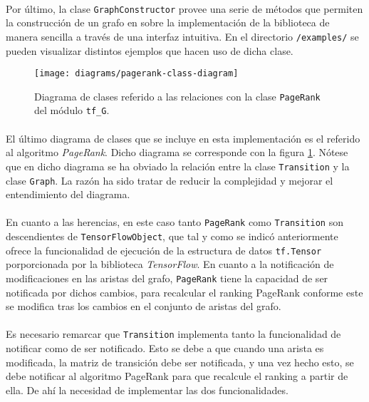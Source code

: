 \documentclass{subfiles}
\begin{document}
          \paragraph{}
          Por último, la clase \texttt{GraphConstructor} provee una serie de métodos que permiten la construcción de un grafo en sobre la implementación de la biblioteca de manera sencilla a través de una interfaz intuitiva. En el directorio \texttt{/examples/} se pueden visualizar distintos ejemplos que hacen uso de dicha clase.

          \begin{figure}[h!]
            \centering
            \texttt{[image: diagrams/pagerank-class-diagram]}
            \caption{Diagrama de clases referido a las relaciones con la clase \texttt{PageRank} del módulo \texttt{tf\_G}.}
            \label{img:pagerank_diagram}
          \end{figure}

          \paragraph{}
          El último diagrama de clases que se incluye en esta implementación es el referido al algoritmo \emph{PageRank}. Dicho diagrama se corresponde con la figura \ref{img:pagerank_diagram}. Nótese que en dicho diagrama se ha obviado la relación entre la clase \texttt{Transition} y la clase \texttt{Graph}. La razón ha sido tratar de reducir la complejidad y mejorar el entendimiento del diagrama.

          \paragraph{}
          En cuanto a las herencias, en este caso tanto \texttt{PageRank} como \texttt{Transition} son descendientes de \texttt{TensorFlowObject}, que tal y como se indicó anteriormente ofrece la funcionalidad de ejecución de la estructura de datos \texttt{tf.Tensor} porporcionada por la biblioteca \emph{TensorFlow}. En cuanto a la notificación de modificaciones en las aristas del grafo, \texttt{PageRank} tiene la capacidad de ser notificada por dichos cambios, para recalcular el ranking PageRank conforme este se modifica tras los cambios en el conjunto de aristas del grafo.

          \paragraph{}
          Es necesario remarcar que \texttt{Transition} implementa tanto la funcionalidad de notificar como de ser notificado. Esto se debe a que cuando una arista es modificada, la matriz de transición debe ser notificada, y una vez hecho esto, se debe notificar al algoritmo PageRank para que recalcule el ranking a partir de ella. De ahí la necesidad de implementar las dos funcionalidades.
\end{document}
